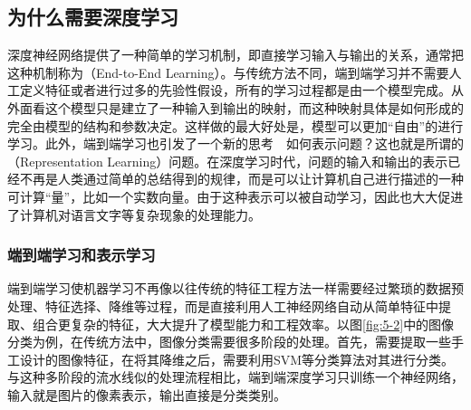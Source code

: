 
\subsection{为什么需要深度学习}

\parinterval 深度神经网络提供了一种简单的学习机制，即直接学习输入与输出的关系，通常把这种机制称为{\small{}}（End-to-End Learning）。与传统方法不同，端到端学习并不需要人工定义特征或者进行过多的先验性假设，所有的学习过程都是由一个模型完成。从外面看这个模型只是建立了一种输入到输出的映射，而这种映射具体是如何形成的完全由模型的结构和参数决定。这样做的最大好处是，模型可以更加``自由''的进行学习。此外，端到端学习也引发了一个新的思考\ \dash \ 如何表示问题？这也就是所谓的{\small{}}（Representation Learning）问题。在深度学习时代，问题的输入和输出的表示已经不再是人类通过简单的总结得到的规律，而是可以让计算机自己进行描述的一种可计算``量''，比如一个实数向量。由于这种表示可以被自动学习，因此也大大促进了计算机对语言文字等复杂现象的处理能力。


\subsubsection{端到端学习和表示学习}

\parinterval 端到端学习使机器学习不再像以往传统的特征工程方法一样需要经过繁琐的数据预处理、特征选择、降维等过程，而是直接利用人工神经网络自动从简单特征中提取、组合更复杂的特征，大大提升了模型能力和工程效率。以图\ref{fig:5-2}中的图像分类为例，在传统方法中，图像分类需要很多阶段的处理。首先，需要提取一些手工设计的图像特征，在将其降维之后，需要利用SVM等分类算法对其进行分类。与这种多阶段的流水线似的处理流程相比，端到端深度学习只训练一个神经网络，输入就是图片的像素表示，输出直接是分类类别。

